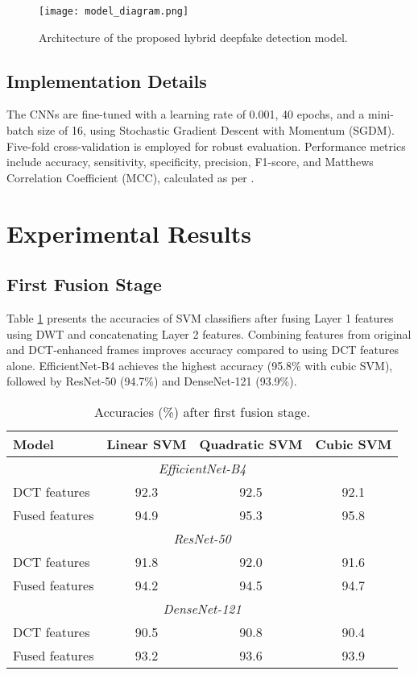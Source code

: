 \documentclass[12pt]{article}
\begin{document}
\begin{figure}[h]
    \centering
    \texttt{[image: model\_diagram.png]}
    \caption{Architecture of the proposed hybrid deepfake detection model.}
    \label{fig:model}
\end{figure}

\subsection{Implementation Details}
The CNNs are fine-tuned with a learning rate of 0.001, 40 epochs, and a mini-batch size of 16, using Stochastic Gradient Descent with Momentum (SGDM). Five-fold cross-validation is employed for robust evaluation. Performance metrics include accuracy, sensitivity, specificity, precision, F1-score, and Matthews Correlation Coefficient (MCC), calculated as per \citet{attallah2024hybrid}.

\section{Experimental Results}
\subsection{First Fusion Stage}
Table \ref{tab:first_fusion} presents the accuracies of SVM classifiers after fusing Layer 1 features using DWT and concatenating Layer 2 features. Combining features from original and DCT-enhanced frames improves accuracy compared to using DCT features alone. EfficientNet-B4 achieves the highest accuracy (95.8\% with cubic SVM), followed by ResNet-50 (94.7\%) and DenseNet-121 (93.9\%).

\begin{table}[h]
    \centering
    \caption{Accuracies (\%) after first fusion stage.}
    \label{tab:first_fusion}
    \begin{tabular}{lccc}
        \toprule
        \textbf{Model} & \textbf{Linear SVM} & \textbf{Quadratic SVM} & \textbf{Cubic SVM} \\
        \midrule
        \multicolumn{4}{c}{\textit{EfficientNet-B4}} \\
        DCT features & 92.3 & 92.5 & 92.1 \\
        Fused features & 94.9 & 95.3 & 95.8 \\
        \multicolumn{4}{c}{\textit{ResNet-50}} \\
        DCT features & 91.8 & 92.0 & 91.6 \\
        Fused features & 94.2 & 94.5 & 94.7 \\
        \multicolumn{4}{c}{\textit{DenseNet-121}} \\
        DCT features & 90.5 & 90.8 & 90.4 \\
        Fused features & 93.2 & 93.6 & 93.9 \\
        \bottomrule
    \end{tabular}
\end{table}
\end{document}
